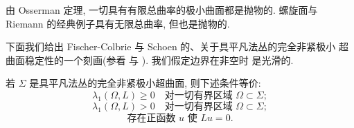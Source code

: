 \begin{remark}
\label{rem:1.38}
由 Osserman 定理, 一切具有有限总曲率的极小曲面都是抛物的. 螺旋面与
Riemann 的经典例子具有无限总曲率, 但也是抛物的.
\end{remark}

下面我们给出 Fischer-Colbrie 与 Schoen 的、关于具平凡法丛的完全非紧极小
超曲面稳定性的一个刻画(参看 \cite{Ba} 与 \cite{Du}). 我们假定边界在非空时
是光滑的.

\begin{proposition}
\label{prop:1.39}
若 $\Sigma$ 是具平凡法丛的完全非紧极小超曲面, 则下述条件等价:
\begin{equation}
\lambda_1(\Omega,L)\geq0
 \quad\text{对一切有界区域 } \Omega\subset\Sigma;
\label{eq:1.188}
\end{equation}
\begin{equation}
\lambda_1(\Omega,L)>0
 \quad\text{对一切有界区域 } \Omega\subset\Sigma;
\label{eq:1.189}
\end{equation}
\begin{equation}
\text{存在正函数 } u \text{ 使 } Lu=0.
\label{eq:1.190}
\end{equation}
\end{proposition}

